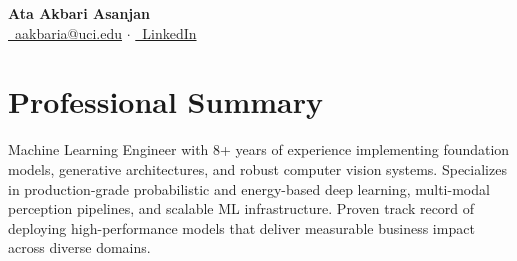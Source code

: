 \documentclass[11pt,a4paper]{article}
\begin{document}
\begin{center}
{\Huge \textbf{Ata Akbari Asanjan}}\\[0.3cm]
\href{mailto:aakbaria@uci.edu}{\faEnvelope\ aakbaria@uci.edu} $\cdot$
\href{https://www.linkedin.com/in/ataakbariasanjan/}{\faLinkedin\ LinkedIn}
\end{center}

\section*{Professional Summary}
Machine Learning Engineer with 8+ years of experience implementing foundation models, generative architectures, and robust computer vision systems. Specializes in production-grade probabilistic and energy-based deep learning, multi-modal perception pipelines, and scalable ML infrastructure. Proven track record of deploying high-performance models that deliver measurable business impact across diverse domains.
\end{document}
